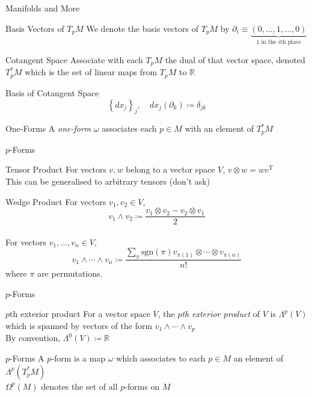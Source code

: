 \documentclass[handout]{beamer}
\newcommand{\Real}{\mathbb{R}}
\begin{document}
  \begin{frame}{Manifolds and More}
      \pause
      \begin{block}{Basis Vectors of $T_p M$}
          We denote the basis vectors of $T_p M$ by $\partial_i \equiv
          \underbrace{(0, \ldots, 1, \ldots, 0)}_{\text{1 in the $i$th place}}$
      \end{block}
      \pause
      \begin{block}{Cotangent Space}
          Associate with each $T_p M$ the dual of that vector space, denoted
          $T^*_p M$ which is the set of linear maps from $T_p M$ to $\Real$
      \end{block}
      \pause
      \begin{block}{Basis of Cotangent Space}
          $$\left\{ dx_j \right\}_j, \quad dx_j(\partial_k) \coloneqq
          \delta_{jk}$$
      \end{block}
      \pause
      \begin{block}{One-Forms}
          A \textit{one-form} $\omega$ associates each $p \in M$ with an
          element of $T^*_p M$
      \end{block}
  \end{frame}
  \begin{frame}{$p$-Forms}
      \pause
      \begin{block}{Tensor Product}
          For vectors $v, w$ belong to a vector space $V$, $v
          \otimes w = wv^{\mathrm{T}}$\pause\\
          This can be generalised to arbitrary tensors (\alert{don't ask})
      \end{block}
      \pause
      \begin{block}{Wedge Product}
          For vectors $v_1, v_2 \in V$, $$v_1 \wedge v_2 \coloneqq \frac{v_1
          \otimes v_2 - v_2 \otimes v_1}{2}$$ \pause \\
          For vectors $v_1, \ldots, v_n \in V$, $$v_1 \wedge \cdots \wedge v_n
          \coloneqq \frac{\sum_{\pi} \mathrm{sgn}(\pi) v_{\pi(1)} \otimes
          \cdots \otimes v_{\pi(n)}}{n!}$$
          where $\pi$ are permutations.
      \end{block}
  \end{frame}
  \begin{frame}{$p$-Forms}
      \pause
      \begin{block}{$p$th exterior product}
          For a vector space $V$, the \textit{$p$th exterior product} of $V$ is
          $\Lambda^p(V)$ which is spanned by vectors of the form $v_1 \wedge
          \cdots \wedge v_p$ \pause \\
          By convention, $\Lambda^0(V) \coloneqq \Real$
      \end{block}
      \pause
      \begin{block}{$p$-Forms}
          A $p$-form is a map $\omega$ which associates to each $p \in M$ an
          element of $\Lambda^p(T_p^* M)$ \pause \\
          $\Omega^p (M)$ denotes the set of all $p$-forms on $M$
      \end{block}
  \end{frame}
\end{document}
